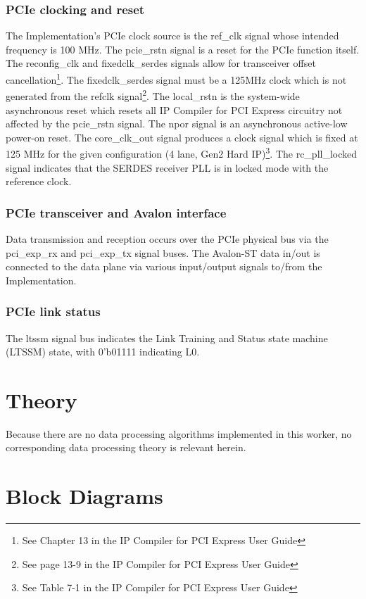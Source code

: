 \documentclass{article}
\begin{document}
\begin{flushleft}
	\subsubsection*{PCIe clocking and reset}
	The Implementation's PCIe clock source is the ref\_clk signal whose intended frequency is 100 MHz. The pcie\_rstn signal is a reset for the PCIe function itself. The reconfig\_clk and fixedclk\_serdes signals allow for transceiver offset cancellation\footnote{See Chapter 13 in the IP Compiler for PCI Express User Guide}. The fixedclk\_serdes signal must be a 125MHz clock which is not generated from the refclk signal\footnote{See page 13-9 in the IP Compiler for PCI Express User Guide}. The local\_rstn is the system-wide asynchronous reset which resets all IP Compiler for PCI Express circuitry not affected by the pcie\_rstn signal. The npor signal is an asynchronous active-low power-on reset. The core\_clk\_out signal produces a clock signal which is fixed at 125 MHz for the given configuration (4 lane, Gen2 Hard IP)\footnote{See Table 7-1 in the IP Compiler for PCI Express User Guide}. The rc\_pll\_locked signal indicates that the SERDES receiver PLL is in locked mode with the reference clock.
	\subsubsection*{PCIe transceiver and Avalon interface}
	Data transmission and reception occurs over the PCIe physical bus via the pci\_exp\_rx and pci\_exp\_tx signal buses. The Avalon-ST data in/out is connected to the data plane via various input/output signals to/from the Implementation.
	\subsubsection*{PCIe link status}
	The ltssm signal bus indicates the Link Training and Status state machine (LTSSM) state, with 0'b01111 indicating L0.\medskip
\end{flushleft}
\pagebreak

\section*{Theory}
Because there are no data processing algorithms implemented in this worker, no corresponding data processing theory is relevant herein.

\section*{Block Diagrams}
\end{document}
